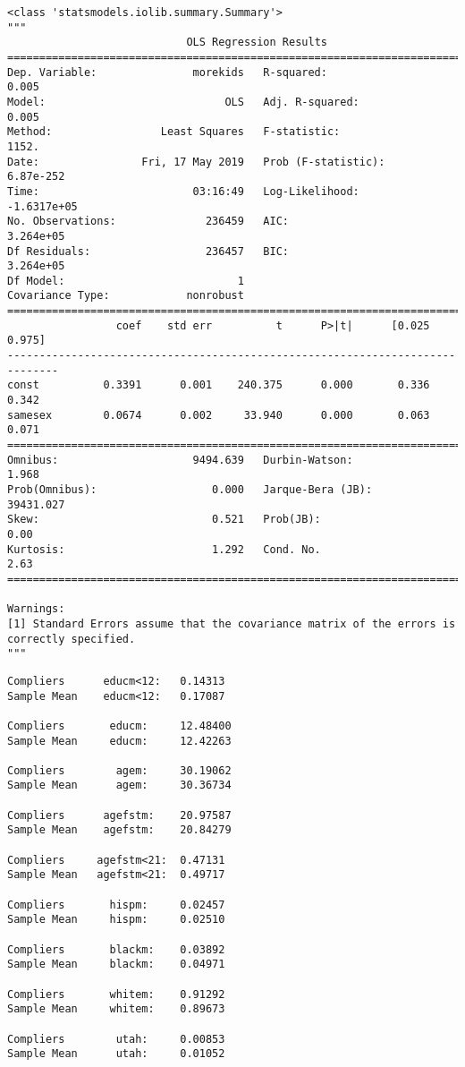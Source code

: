 \documentclass[11pt]{article}
\begin{document}
    
    \begin{verbatim}
<class 'statsmodels.iolib.summary.Summary'>
"""
                            OLS Regression Results                            
==============================================================================
Dep. Variable:               morekids   R-squared:                       0.005
Model:                            OLS   Adj. R-squared:                  0.005
Method:                 Least Squares   F-statistic:                     1152.
Date:                Fri, 17 May 2019   Prob (F-statistic):          6.87e-252
Time:                        03:16:49   Log-Likelihood:            -1.6317e+05
No. Observations:              236459   AIC:                         3.264e+05
Df Residuals:                  236457   BIC:                         3.264e+05
Df Model:                           1                                         
Covariance Type:            nonrobust                                         
==============================================================================
                 coef    std err          t      P>|t|      [0.025      0.975]
------------------------------------------------------------------------------
const          0.3391      0.001    240.375      0.000       0.336       0.342
samesex        0.0674      0.002     33.940      0.000       0.063       0.071
==============================================================================
Omnibus:                     9494.639   Durbin-Watson:                   1.968
Prob(Omnibus):                  0.000   Jarque-Bera (JB):            39431.027
Skew:                           0.521   Prob(JB):                         0.00
Kurtosis:                       1.292   Cond. No.                         2.63
==============================================================================

Warnings:
[1] Standard Errors assume that the covariance matrix of the errors is correctly specified.
"""
    \end{verbatim}

    
    \begin{Verbatim}[commandchars=\\\{\}]
Compliers      educm<12:   0.14313
Sample Mean    educm<12:   0.17087 

Compliers       educm:     12.48400
Sample Mean     educm:     12.42263 

Compliers        agem:     30.19062
Sample Mean      agem:     30.36734 

Compliers      agefstm:    20.97587
Sample Mean    agefstm:    20.84279 

Compliers     agefstm<21:  0.47131
Sample Mean   agefstm<21:  0.49717 

Compliers       hispm:     0.02457
Sample Mean     hispm:     0.02510 

Compliers       blackm:    0.03892
Sample Mean     blackm:    0.04971 

Compliers       whitem:    0.91292
Sample Mean     whitem:    0.89673 

Compliers        utah:     0.00853
Sample Mean      utah:     0.01052 


    \end{Verbatim}
\end{document}
